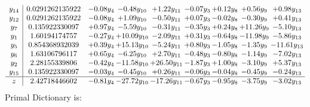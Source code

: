 \documentclass[9pt]{article}
\begin{document}
\[\begin{array}{c| c c@{\hskip 2pt} c@{\hskip 2pt} c@{\hskip 2pt} c@{\hskip 2pt} c@{\hskip 2pt} c@{\hskip 2pt} c@{\hskip 2pt} }
 y_{14}   &  0.0291262135922 & -0.08 y_{4} & -0.48 y_{10} & +  1.22 y_{11} & -0.07 y_{3} & +  0.12 y_{8} & +  0.56 y_{9} & +  0.98 y_{13}\\
 y_{12}   &  0.0291262135922 & -0.08 y_{4} & +  1.09 y_{10} & -0.50 y_{11} & +  0.07 y_{3} & -0.02 y_{8} & -0.30 y_{9} & +  0.41 y_{13}\\
 y_{7}   &  0.135922330097 & +  0.97 y_{4} & -5.59 y_{10} & -0.31 y_{11} & -0.35 y_{3} & +  0.24 y_{8} & + 11.26 y_{9} & -5.10 y_{13}\\
 y_{1}   &  1.60194174757 & -0.27 y_{4} & + 10.09 y_{10} & -2.09 y_{11} & +  0.31 y_{3} & -0.64 y_{8} & -11.98 y_{9} & -5.86 y_{13}\\
 y_{5}   &  0.854368932039 & +  0.39 y_{4} & + 15.13 y_{10} & -5.24 y_{11} & +  0.80 y_{3} & -1.05 y_{8} & -1.35 y_{9} & -11.61 y_{13}\\
 y_{6}   &  1.63106796117 & +  0.65 y_{4} & -6.25 y_{10} & +  2.70 y_{11} & -0.48 y_{3} & -0.80 y_{8} & -1.14 y_{9} & -7.02 y_{13}\\
 y_{2}   &  2.28155339806 & -0.42 y_{4} & -11.58 y_{10} & + 26.50 y_{11} & -1.87 y_{3} & +  1.00 y_{8} & -3.10 y_{9} & +  5.37 y_{13}\\
 y_{15}   &  0.135922330097 & -0.03 y_{4} & -0.45 y_{10} & +  0.26 y_{11} & -0.06 y_{3} & -0.04 y_{8} & -0.45 y_{9} & -0.24 y_{13}\\
\hline
z    &  2.42718446602 & -0.81 y_{4} & -27.72 y_{10} & -17.26 y_{11} & -0.67 y_{3} & -0.95 y_{8} & -3.75 y_{9} & -3.02 y_{13}\\
\end{array}\]
Primal Dictionary is:
\end{document}
